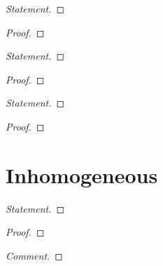 
\begin{proof}[Statement]\renewcommand{\qedsymbol}{}

\end{proof}
\begin{proof}[Proof]\renewcommand{\qedsymbol}{}

\end{proof}


\begin{proof}[Statement]\renewcommand{\qedsymbol}{}

\end{proof}
\begin{proof}[Proof]\renewcommand{\qedsymbol}{}

\end{proof}


\begin{proof}[Statement]\renewcommand{\qedsymbol}{}

\end{proof}
\begin{proof}[Proof]\renewcommand{\qedsymbol}{}

\end{proof}

\section*{Inhomogeneous}


\begin{proof}[Statement]\renewcommand{\qedsymbol}{}

\end{proof}
\begin{proof}[Proof]\renewcommand{\qedsymbol}{}

\end{proof}


\begin{proof}[Comment]\renewcommand{\qedsymbol}{}

\end{proof}


